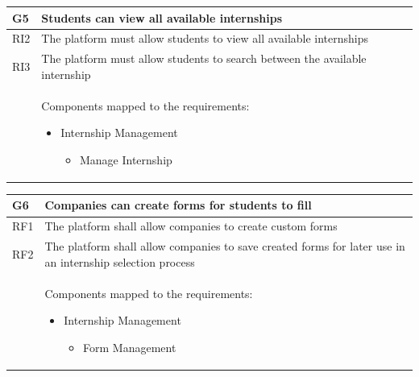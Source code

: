 \documentclass[11pt,twoside]{article}
\begin{document}
\newpage

\begin{table}[H]
\begin{tabular}{| p{} | p{} |}
\hline
\rowcolor{Gray1}
\textbf{G5} & \textbf{Students can view all available internships} \\
\hline
\rowcolor{Gray2}
RI2 & The platform must allow students to view all available internships \\
\hline
\rowcolor{Gray2}
RI3 & The platform must allow students to search between the available internship \\
\hline
 & Components mapped to the requirements:
\begin{itemize}
\item Internship Management
 	\begin{itemize}
 	\item Manage Internship
 	\end{itemize}
\end{itemize} \\
\hline
\end{tabular}
\end{table}

\begin{table}[H]
\begin{tabular}{| p{} | p{} |}
\hline
\rowcolor{Gray1}
\textbf{G6} & \textbf{Companies can create forms for students to fill} \\
\hline
\rowcolor{Gray2}
RF1 & The platform shall allow companies to create custom forms \\
\hline
\rowcolor{Gray2}
RF2 & The platform shall allow companies to save created forms for later use in an internship selection process \\
\hline
 & Components mapped to the requirements:
\begin{itemize}
\item Internship Management
 	\begin{itemize}
 	\item Form Management
 	\end{itemize}
\end{itemize} \\
\hline
\end{tabular}
\end{table}
\end{document}
